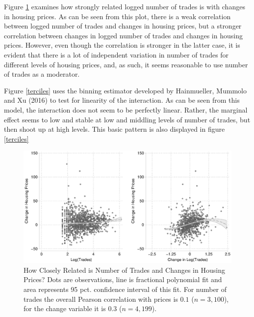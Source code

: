 \documentclass[12pt,a4paper]{article}
\begin{document}
			Figure \ref{scatter} examines how strongly related logged number of trades is with changes in housing prices. As can be seen from this plot, there is a weak correlation between logged number of trades and changes in housing prices, but a stronger correlation between changes in logged number of trades and changes in housing prices. However, even though the correlation is stronger in the latter case, it is evident that there is a lot of independent variation in number of trades for different levels of housing prices, and, as such, it seems reasonable to use number of trades as a moderator.
			
			Figure \ref{terciles} uses the binning estimator developed by Hainmueller, Mummolo and Xu (2016) to test for linearity of the interaction. As can be seen from this model, the interaction does not seem to be perfectly linear. Rather, the marginal effect seems to low and stable at low and middling levels of number of trades, but then shoot up at high levels.  This basic pattern is also displayed in figure  \ref{terciles}
			
			\begin{figure}
				\includegraphics[width=1\textwidth]{../figures/corrmoderator.eps}
				\caption{How Closely Related is Number of Trades and Changes in Housing Prices? Dots are observations, line is fractional polynomial fit and area represents 95 pct. confidence interval of this fit. For number of trades the overall Pearson correlation with prices is $0.1$ ($n=3,100$), for the change variable it is $0.3$ ($n=4,199$). }
				\label{scatter}
			\end{figure}
			
\end{document}
